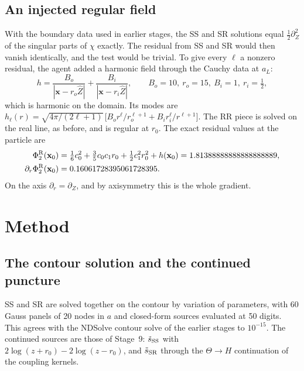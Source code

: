 \documentclass[11pt,a4paper]{article}
\newcommand{\x}{\mathbf{x}}
\begin{document}
\subsection{An injected regular field}
With the boundary data used in earlier stages, the SS and SR solutions equal $\tfrac12\partial_Z^2$ of the singular parts of $\chi$ exactly.
The residual from SS and SR would then vanish identically, and the test would be trivial.
To give every $\ell$ a nonzero residual, the agent added a harmonic field through the Cauchy data at $a_L$:
\begin{equation}
h=\frac{B_o}{|\x-r_o\hat Z|}+\frac{B_i}{|\x-r_i\hat Z|},\qquad B_o=10,\ r_o=15,\ B_i=1,\ r_i=\tfrac12,
\end{equation}
which is harmonic on the domain.
Its modes are $h_\ell(r)=\sqrt{4\pi/(2\ell+1)}\,\big[B_o r^\ell/r_o^{\ell+1}+B_i r_i^\ell/r^{\ell+1}\big]$.
The RR piece is solved on the real line, as before, and is regular at $r_0$.
The exact residual values at the particle are
\begin{align}
\Phi_2^{\rm R}(\x_0)&=\tfrac16c_0^2+\tfrac35c_0c_1r_0+\tfrac12c_1^2r_0^2+h(\x_0)=1.81388888888888888889,\\
\partial_r\Phi_2^{\rm R}(\x_0)&=0.16061728395061728395.
\end{align}
On the axis $\partial_r=\partial_Z$, and by axisymmetry this is the whole gradient.

\section{Method}\label{sec:method}

\subsection{The contour solution and the continued puncture}
SS and SR are solved together on the contour by variation of parameters, with 60 Gauss panels of 20 nodes in $a$ and closed-form sources evaluated at 50 digits.
This agrees with the NDSolve contour solve of the earlier stages to $10^{-15}$.
The continued sources are those of Stage~9: $\tilde s_{\rm SS}$ with $2\log(z+r_0)-2\log(z-r_0)$, and $\tilde s_{\rm SR}$ through the $\Theta\to H$ continuation of the coupling kernels.
\end{document}
